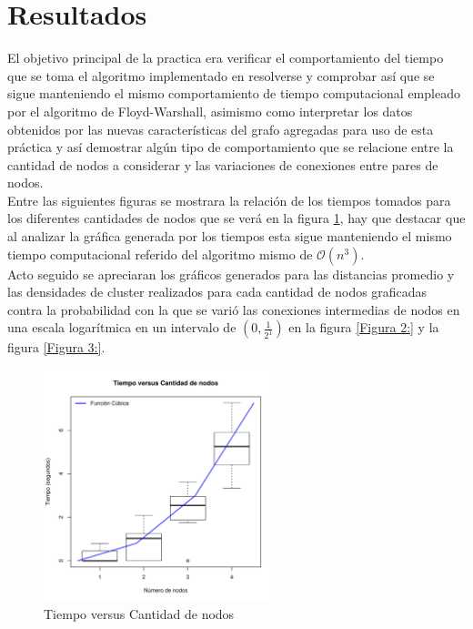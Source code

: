 \documentclass[12pt]{article}
\begin{document}
\section{Resultados}
El objetivo principal de la practica era verificar el comportamiento del tiempo que se toma el algoritmo implementado en resolverse y comprobar así que se sigue manteniendo el mismo comportamiento de tiempo computacional empleado por el algoritmo de Floyd-Warshall, asimismo como interpretar los datos obtenidos por las nuevas características del grafo agregadas para uso de esta práctica y así demostrar algún tipo de comportamiento que se relacione entre la cantidad de nodos a considerar y las variaciones de conexiones entre pares de nodos.\\
Entre las siguientes figuras se mostrara la relación de los tiempos tomados para los diferentes cantidades de nodos que se verá en la figura \ref{Figura 1:}, hay que destacar que al analizar la gráfica generada por los tiempos esta sigue manteniendo el mismo tiempo computacional referido del algoritmo mismo de $\mathcal{O}$$(n^3)$.
\\Acto seguido se apreciaran los gráficos generados para las distancias promedio y las densidades de cluster realizados para cada cantidad de nodos graficadas contra la probabilidad con la que se varió las conexiones intermedias de nodos en una escala logarítmica en un intervalo de $(0,\frac{1}{2^1})$ en la figura \ref{Figura 2:} y la figura \ref{Figura 3:}.\\
\begin{figure}[h!]
	\centering
	\includegraphics[width=0.6\textwidth]{TiempovsN}
	\caption{Tiempo versus Cantidad de nodos\label{Figura 1:}}
\end{figure}\pagebreak
\begin{figure}[h]

\end{figure}$$
\end{document}
